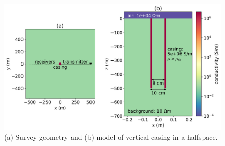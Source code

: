 \begin{figure}[H]
    \centering
    \includegraphics[width=\columnwidth]{figures/setup.png}
\caption{(a) Survey geometry and (b) model of vertical casing in a halfspace.
}
\label{fig:setup}
\end{figure}



